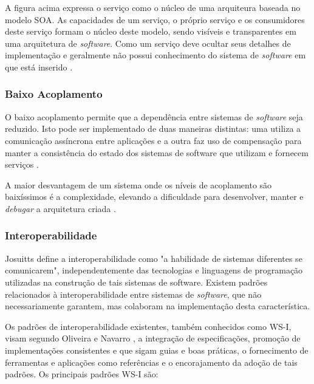 A figura acima expressa o serviço como o núcleo de uma arquiteura baseada no modelo SOA. As capacidades de um serviço, o próprio serviço e os consumidores deste serviço formam o núcleo deste modelo, sendo visíveis e transparentes em uma arquitetura de \textit{software}. Como um serviço deve ocultar seus detalhes de implementação e geralmente não possui conhecimento do sistema de \textit{software} em que está inserido \cite{nickull_service_2007}.

\subsubsection{Baixo Acoplamento}
O baixo acoplamento permite que a dependência entre sistemas de \textit{software} seja reduzido. Isto pode ser implementado de duas maneiras distintas: uma utiliza a comunicação assíncrona entre aplicações e a outra faz uso de compensação para manter a consistência do estado dos sistemas de software que utilizam e fornecem serviços \cite{josuttis_soa_2007}.

A maior desvantagem de um sistema onde os níveis de acoplamento são baixíssimos é a complexidade, elevando a dificuldade para desenvolver, manter e \textit{debugar} a arquitetura criada \cite{josuttis_soa_2007}.

\subsubsection{Interoperabilidade}
Josuitts \cite{josuttis_soa_2007} define a interoperabilidade como "a habilidade de sistemas diferentes se comunicarem", independentemente das tecnologias e linguagens de programação utilizadas na construção de tais sistemas de software. Existem padrões relacionados à interoperabilidade entre sistemas de \textit{software}, que não necessariamente garantem, mas colaboram na implementação desta característica. 

Os padrões de interoperabilidade existentes, também conhecidos como WS-I, visam segundo Oliveira e Navarro \cite{oliveira_interoperabilidade}, a integração de especificações, promoção de implementações consistentes e que sigam guias e boas práticas, o fornecimento de ferramentas e aplicações como referências e o encorajamento da adoção de tais padrões. Os principais padrões WS-I são:

